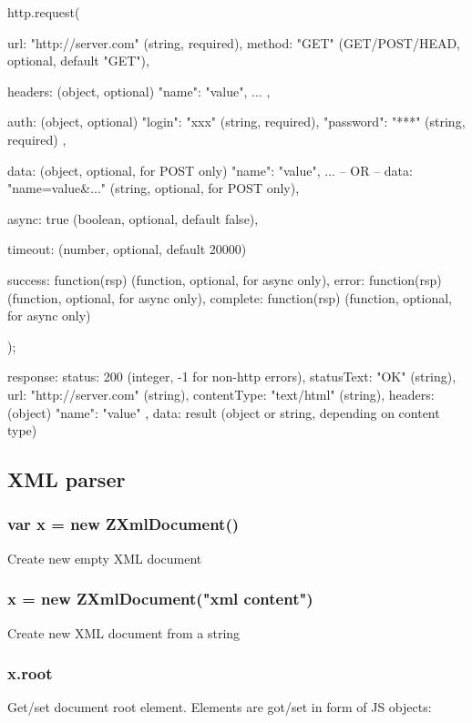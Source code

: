 \begin{listingverbatim}
http.request({
	url: "http://server.com" (string, required),
	method: "GET" (GET/POST/HEAD, optional, default "GET"),
	
	headers: (object, optional)
	{
		"name": "value",
		...
	},
	
	auth: (object, optional)
	{
		"login": "xxx" (string, required),
		"password": "***" (string, required)
	},
	
	data: (object, optional, for POST only)
	{
		"name": "value",
		...
	}
	-- OR --
	data: "name=value&..." (string, optional, for POST only),

	async: true (boolean, optional, default false),

	timeout: (number, optional, default 20000)
	
	success: function(rsp) {} (function, optional, for async only),
	error: function(rsp) {} (function, optional, for async only),
	complete: function(rsp) {} (function, optional, for async only)
});


response:
{
	status: 200 (integer, -1 for non-http errors),
	statusText: "OK" (string),
	url: "http://server.com" (string),
	contentType: "text/html" (string),
	headers: (object)
	{
		"name": "value"
	},
	data: result (object or string, depending on content type)
}
\end{listingverbatim}

\subsection{XML parser}


\subsubsection{var x = new ZXmlDocument()}
Create new empty XML document

\subsubsection{x = new ZXmlDocument("xml content")}
Create new XML document from a string

\subsubsection{x.root}
Get/set document root element. Elements are got/set in form of JS objects:

